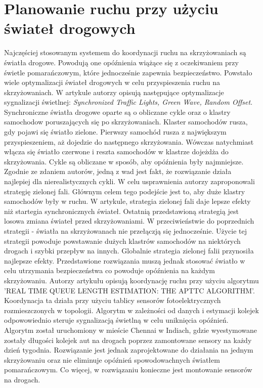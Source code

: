 \section{Planowanie ruchu przy użyciu świateł drogowych}

\indent
Najczęściej stosowanym systemem do koordynacji ruchu na skrzyżowaniach są światła drogowe. Powodują one opóźnienia wiążące się z oczekiwaniem przy świetle pomarańczowym, które jednocześnie zapewnia bezpieczeństwo. Powstało wiele optymalizacji świateł drogowych w celu przyspieszenia ruchu na skrzyżowaniach.
\newline
\indent
W artykule \cite{brockfeld2001optimizing} autorzy opisują następujące optymalizacje sygnalizacji świetlnej: \textit{Synchronized Traffic Lights, Green Wave, Random Offset}. Synchroniczne światła drogowe oparte są o obliczane cykle oraz o klastry samochodow poruszających się po skrzyżowaniach. Klaster samochodów rusza, gdy pojawi się światło zielone. Pierwszy samochód rusza z największym przyspieszeniem, aż dojedzie do następnego skrzyżowania. Wówczas natychmiast włącza się światło czerwone i reszta samochodów w klastrze dojeżdża do skrzyżowania. Cykle są obliczane w sposób, aby opóźnienia były najmniejsze. Zgodnie ze zdaniem autorów, jedną z wad jest fakt, że rozwiązanie działa najlepiej dla nierealistycznych cykli. W celu usprawnienia autorzy zaproponowali strategię zielonej fali. Głównym celem tego podejście jest to, aby duże klastry samochodów były w ruchu. W artykule, strategia zielonej fali daje lepsze efekty niż startegia synchronicznych świateł. Ostatnią przedstawioną strategią jest losowa zmiana świateł przed skrzyżowaniami. W przeciwieństwie do poprzednich strategii - światła na skrzyżowanach nie przełączją się jednocześnie. Użycie tej strategii powoduje powstawanie dużych klastrów samochodów na niektórych drogach i szybki przepływ na innych. Globalnie strategia zielonej falii przynosiła najlepsze efekty. Przedstawione rozwiązania muszą jednak stosować światło w celu utrzymania bezpieczeństwa co powoduje opóźnienia na każdym skrzyżowaniu.
\newline
\indent
Autorzy artykułu \cite{athmaraman2005adaptive} opisują koordynację ruchu przy użyciu algorytmu 'REAL TIME QUEUE LENGTH ESTIMATION: THE APTTC ALGORITHM'. Koordynacja ta działa przy użyciu tablicy sensorów fotoelektrycznych rozmieszczonych w topologii. Algorytm w zależności od danych i estymacji kolejek odpowowiednio steruje sygnalizacją świetlną w celu uniknięcia opóźnień. Algorytm został uruchomiony w mieście Chennai w Indiach, gdzie wyestymowane zostały długości kolejek aut na drogach poprzez zamontowane sensory na każdy dzień tygodnia. Rozwiązanie jest jednak zaprojektowane do działania na jednym skrzyżowaniu oraz nie eliminuje opóźnień spowodowachnych światłem pomarańczowym. Co więcej, w rozwiązaniu konieczne jest montowanie sensorów na drogach.
